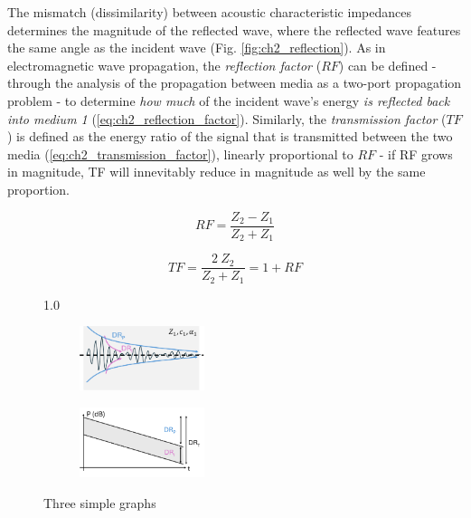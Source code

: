 The mismatch (dissimilarity) 
between acoustic characteristic impedances determines the magnitude of the reflected wave, 
where the reflected wave features the same angle as the incident wave (Fig. \ref{fig:ch2_reflection}). 
As in electromagnetic wave propagation, the \textit{reflection factor} ($RF$) can be defined - through the 
analysis of the propagation between media as a two-port propagation problem - to determine \textit{how much} 
of the incident wave's energy \textit{is reflected back into medium 1} (\ref{eq:ch2_reflection_factor}). 
Similarly, the \textit{transmission factor} ($TF$) is defined as the energy ratio of the signal that is 
transmitted between the two media (\ref{eq:ch2_transmission_factor}), linearly proportional to $RF$ - if RF grows in 
magnitude, TF will innevitably reduce in magnitude as well by the same proportion.

\begin{equation}
  RF = \frac{Z_2 - Z_1}{Z_2 + Z_1}
  \label{eq:ch2_reflection_factor}
\end{equation}

\begin{equation}
  TF = \frac{2 \ Z_2}{Z_2 + Z_1} = 1 + RF
  \label{eq:ch2_transmission_factor}
\end{equation}

\begin{figure}[h]{1.0\textwidth}
    \centering
  \begin{subfigure}[b]{0.4\textwidth}
      \centering
      \includegraphics[width=0.4\textwidth]{Chapters/Figures/Ch2_UltrasoundFundamentals/attenuation.pdf}
      \label{fig:ch2_attenuation}
  \end{subfigure}
  \hfill
  \begin{subfigure}[b]{0.4\textwidth}
      \centering
      \includegraphics[width=0.4\textwidth]{Chapters/Figures/Ch2_UltrasoundFundamentals/dynamic_range.pdf}
      \label{fig:ch2_dynamic_range}
  \end{subfigure}
     \caption{Three simple graphs}
     \label{fig:ch2_elastic_waves}
\end{figure}

